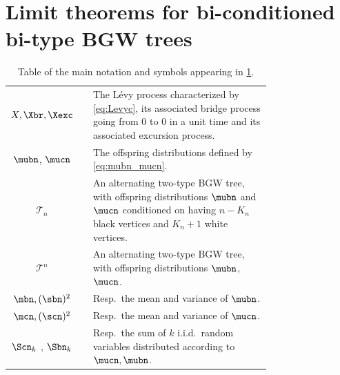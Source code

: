 \section{Limit theorems for bi-conditioned bi-type BGW trees}
\label{sec:limitheorems}


\begin{table}[htbp]\caption{Table of the main notation and symbols appearing in \cref{sec:limitheorems}.}
\centering
\begin{tabular}{c c p{0.75 \linewidth} }
\toprule
$X, \Xbr,\Xexc$ && The L\'evy process characterized by \eqref{eq:Levyc},  its associated  bridge process going from $0$ to $0$ in a unit time and its associated excursion process.\\
$\mubn$, $\mucn$&& The offspring distributions defined by \eqref{eq:mubn_mucn}.\\
$\mathscr{T}_{n}$ & & An alternating two-type BGW tree, with offspring distributions $\mubn$ and $\mucn$ conditioned on having $n-K_{n}$ black vertices and $K_{n}+1$ white vertices.
 \\
 $\mathscr{T}^{n}$ & & An alternating two-type BGW tree, with offspring distributions $\mubn$, $\mucn$.\\
 $\mbn,(\sbn)^{2}$ & & Resp.~the mean and variance of $\mubn$.\\
 $ \mcn,(\scn)^{2}$ & & Resp.~the mean and variance of $\mucn$.\\
 $\Scn_{k}$ , $\Sbn_{k}$ && Resp.~the sum of $k$ i.i.d.\ random variables distributed according to $\mucn,\mubn$.\\
\bottomrule
\end{tabular}
\label{tab:seclim}
\end{table}
